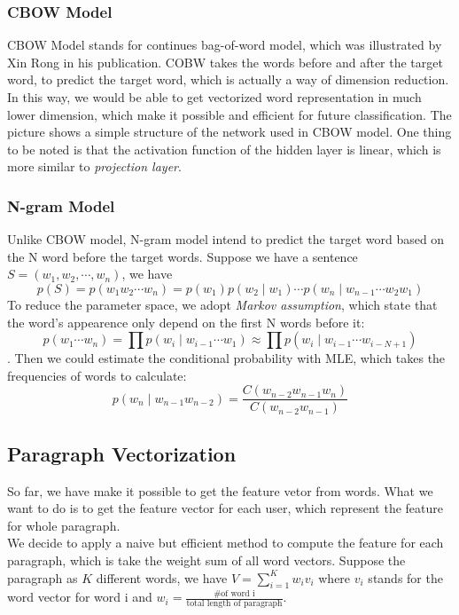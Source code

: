 \documentclass{article}
\begin{document}
\subsubsection{CBOW Model}
CBOW Model stands for continues bag-of-word model, which was illustrated by Xin Rong in his publication. COBW takes the words before and after the target word, to predict the target word, which is actually a way of dimension reduction. In this way, we would be able to get vectorized word representation in much lower dimension, which make it possible and efficient for future classification. The picture shows a simple structure of the network used in CBOW model. One thing to be noted is that the activation function of the hidden layer is linear, which is more similar to \emph{projection layer}.

\subsubsection{N-gram Model}
Unlike CBOW model, N-gram model intend to predict the target word based on the N word before the target words. Suppose we have a sentence $S=\left( w_1,w_2,\cdots,w_n\right) $, we have $$p(S)=p\left(w_{1} w_{2} \cdots w_{n}\right)=p\left(w_{1}\right) p\left(w_{2} \mid w_{1}\right) \cdots p\left(w_{n} \mid w_{n-1} \cdots w_{2} w_{1}\right)$$ To reduce the parameter space, we adopt \emph{Markov assumption}, which state that the word's appearence only depend on the first N words before it: $$p\left(w_{1} \cdots w_{n}\right)=\prod p\left(w_{i} \mid w_{i-1} \cdots w_{1}\right) \approx \prod p\left(w_{i} \mid w_{i-1} \cdots w_{i-N+1}\right)$$. Then we could estimate the conditional probability with MLE, which takes the frequencies of words to calculate:$$p\left(w_{n} \mid w_{n-1} w_{n-2}\right)=\frac{C\left(w_{n-2} w_{n-1} w_{n}\right)}{C\left(w_{n-2} w_{n-1}\right)}$$

\subsection{Paragraph Vectorization}
So far, we have make it possible to get the feature vetor from words. What we want to do is to get the feature vector for each user, which represent the feature for whole paragraph.\\
We decide to apply a naive but efficient method to compute the feature for each paragraph, which is take the weight sum of all word vectors. Suppose the paragraph as $K$ different words, we have $V = \sum_{i=1}^{K}w_iv_i$ where $v_i$ stands for the word vector for word i and $w_i = \frac{\text{\# of word i}}{\text{total length of paragraph}}$.
\end{document}
